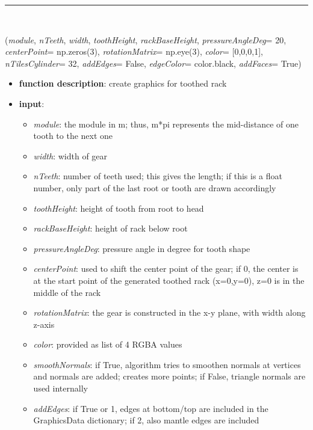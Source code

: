 \begin{itemize}[leftmargin=1.4cm]
\begin{itemize}[leftmargin=1.4cm]
\begin{itemize}[leftmargin=1.4cm]
\begin{itemize}[leftmargin=0.5cm]
\begin{itemize}[leftmargin=1.4cm]
\begin{itemize}[leftmargin=1.4cm]
\begin{itemize}[leftmargin=1.4cm]
\begin{itemize}[leftmargin=0.5cm]
\begin{itemize}[leftmargin=1.4cm]
%
\noindent\rule{8cm}{0.75pt}\vspace{1pt} \\ 
\begin{flushleft}
\label{sec:graphics:ToothedRack}
({\it module}, {\it nTeeth}, {\it width}, {\it toothHeight}, {\it rackBaseHeight}, {\it pressureAngleDeg}= 20, {\it centerPoint}= np.zeros(3), {\it rotationMatrix}= np.eye(3), {\it color}= [0,0,0,1], {\it nTilesCylinder}= 32, {\it addEdges}= False, {\it edgeColor}= color.black, {\it addFaces}= True)
\end{flushleft}
\setlength{\itemindent}{0.7cm}
\begin{itemize}[leftmargin=0.7cm]
\item[--]
{\bf function description}: create graphics for toothed rack
\item[--]
{\bf input}: \vspace{-6pt}
\begin{itemize}[leftmargin=1.2cm]
\setlength{\itemindent}{-0.7cm}
\item[]{\it module}: the module in m; thus, m*pi represents the mid-distance of one tooth to the next one
\item[]{\it width}: width of gear
\item[]{\it nTeeth}: number of teeth used; this gives the length; if this is a float number, only part of the last root or tooth are drawn accordingly
\item[]{\it toothHeight}: height of tooth from root to head
\item[]{\it rackBaseHeight}: height of rack below root
\item[]{\it pressureAngleDeg}: pressure angle in degree for tooth shape
\item[]{\it centerPoint}: used to shift the center point of the gear; if 0, the center is at the start point of the generated toothed rack (x=0,y=0), z=0 is in the middle of the rack
\item[]{\it rotationMatrix}: the gear is constructed in the x-y plane, with width along z-axis
\item[]{\it color}: provided as list of 4 RGBA values
\item[]{\it smoothNormals}: if True, algorithm tries to smoothen normals at vertices and normals are added; creates more points; if False, triangle normals are used internally
\item[]{\it addEdges}: if True or 1, edges at bottom/top are included in the GraphicsData dictionary; if 2, also mantle edges are included

\end{itemize}
\end{itemize}
\end{itemize}
\end{itemize}
\end{itemize}
\end{itemize}
\end{itemize}
\end{itemize}
\end{itemize}
\end{itemize}
\end{itemize}
